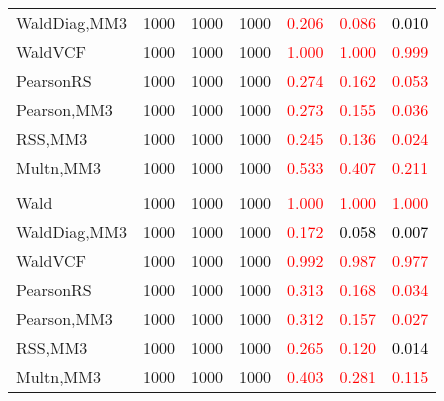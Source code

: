 \documentclass[
]{article}
\begin{document}
\begin{table}[H]
{\begin{tabular}[t]{lrrrrrr}
\hspace{1em}WaldDiag,MM3 & 1000 & 1000 & 1000 & \textcolor{red}{0.206} & \textcolor{red}{0.086} & \textcolor{black}{0.010}\\
\hspace{1em}WaldVCF & 1000 & 1000 & 1000 & \textcolor{red}{1.000} & \textcolor{red}{1.000} & \textcolor{red}{0.999}\\
\hspace{1em}PearsonRS & 1000 & 1000 & 1000 & \textcolor{red}{0.274} & \textcolor{red}{0.162} & \textcolor{red}{0.053}\\
\hspace{1em}Pearson,MM3 & 1000 & 1000 & 1000 & \textcolor{red}{0.273} & \textcolor{red}{0.155} & \textcolor{red}{0.036}\\
\hspace{1em}RSS,MM3 & 1000 & 1000 & 1000 & \textcolor{red}{0.245} & \textcolor{red}{0.136} & \textcolor{red}{0.024}\\
\hspace{1em}Multn,MM3 & 1000 & 1000 & 1000 & \textcolor{red}{0.533} & \textcolor{red}{0.407} & \textcolor{red}{0.211}\\
\addlinespace[0.3em]
\multicolumn{7}{l}{\textbf{3F 15V}}\\
\hspace{1em}Wald & 1000 & 1000 & 1000 & \textcolor{red}{1.000} & \textcolor{red}{1.000} & \textcolor{red}{1.000}\\
\hspace{1em}WaldDiag,MM3 & 1000 & 1000 & 1000 & \textcolor{red}{0.172} & \textcolor{black}{0.058} & \textcolor{black}{0.007}\\
\hspace{1em}WaldVCF & 1000 & 1000 & 1000 & \textcolor{red}{0.992} & \textcolor{red}{0.987} & \textcolor{red}{0.977}\\
\hspace{1em}PearsonRS & 1000 & 1000 & 1000 & \textcolor{red}{0.313} & \textcolor{red}{0.168} & \textcolor{red}{0.034}\\
\hspace{1em}Pearson,MM3 & 1000 & 1000 & 1000 & \textcolor{red}{0.312} & \textcolor{red}{0.157} & \textcolor{red}{0.027}\\
\hspace{1em}RSS,MM3 & 1000 & 1000 & 1000 & \textcolor{red}{0.265} & \textcolor{red}{0.120} & \textcolor{black}{0.014}\\
\hspace{1em}Multn,MM3 & 1000 & 1000 & 1000 & \textcolor{red}{0.403} & \textcolor{red}{0.281} & \textcolor{red}{0.115}\\
\bottomrule
\end{tabular}}
\endgroup{}
\end{table}
\end{document}
